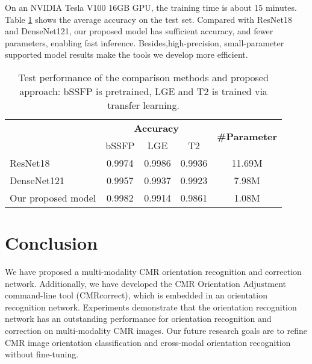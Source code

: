 \documentclass[runningheads]{llncs}
\begin{document}
On an NVIDIA Tesla V100 16GB GPU, the training time is about 15 minutes. Table \ref{tab:result} shows the average accuracy on the test set. Compared with ResNet18 and DenseNet121, our proposed model has sufficient accuracy, and fewer parameters, enabling fast inference. Besides,high-precision, small-parameter supported model results make the tools we develop more efficient.

\begin{table}[htbp]
  \centering
  \caption{Test performance of the comparison methods and proposed approach: bSSFP is pretrained, LGE and T2 is trained via transfer learning.}
  \setlength{\tabcolsep}{4mm}
    \begin{tabular}{lcccc}
    \toprule
          & \multicolumn{3}{c}{\textbf{Accuracy}} & \multicolumn{1}{c}{\multirow{2}[4]{*}{\textbf{\#Parameter}}} \\
\cmidrule{2-4}          & bSSFP & LGE   & T2    &  \\
    \midrule
    ResNet18    & 0.9974    & 0.9986    & 0.9936    & 11.69M \\
    DenseNet121    & 0.9957    & 0.9937    & 0.9923    & 7.98M \\
    Our proposed model & 0.9982 & 0.9914 & 0.9861 & 1.08M\\

    \bottomrule
    \end{tabular}%
  \label{tab:result}%
\end{table}%



\section{Conclusion}

We have proposed a multi-modality CMR orientation recognition and correction network. Additionally, we have developed the CMR Orientation Adjustment command-line tool (CMRcorrect), which is embedded in an orientation recognition network. Experiments demonstrate that the orientation recognition network has an outstanding performance for orientation recognition and correction on multi-modality CMR images. Our future research goals are to refine CMR image orientation classification and cross-modal orientation recognition without fine-tuning.
\end{document}
